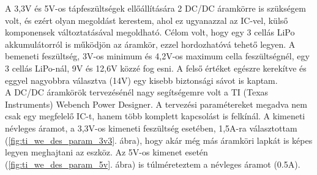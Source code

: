 \documentclass[../main.tex]{subfiles}
\begin{document}
            A 3,3V és 5V-os tápfeszültségek ellőállítására 2 DC/DC áramkörre is szükségem volt, és ezért olyan megoldást kerestem, ahol ez ugyanazzal az IC-vel, külső komponensek változtatásával megoldható. Célom volt, hogy egy 3 cellás LiPo akkumulátorról is működjön az áramkör, ezzel hordozhatóvá tehető legyen. A bemeneti feszültség, 3V-os minimum és 4,2V-os maximum cella feszültségnél, egy 3 cellás LiPo-nál, 9V és 12,6V közzé fog esni. A felső értéket egészre kerekítve és eggyel nagyobbra választva (14V) egy kisebb biztonsági sávot is kaptam.
            \\
            A DC/DC áramkörök tervezésénél nagy segítségemre volt a TI (Texas Instruments) Webench Power Designer.
            A tervezési paramétereket megadva nem csak egy megfelelő IC-t, hanem több komplett kapcsolást is felkínál. A kimeneti névleges áramot, a 3,3V-os kimeneti feszültség esetében, 1,5A-ra választottam (\ref{fig:ti_we_des_param_3v3}. ábra), hogy akár még más áramköri lapkát is képes legyen meghajtani az eszköz. Az 5V-os kimenet esetén (\ref{fig:ti_we_des_param_5v}. ábra) is túlméreteztem a névleges áramot (0.5A).
            \begin{figure}[h!] %
                \begin{floatrow}
                \end{floatrow}
            \end{figure}
            
\end{document}
